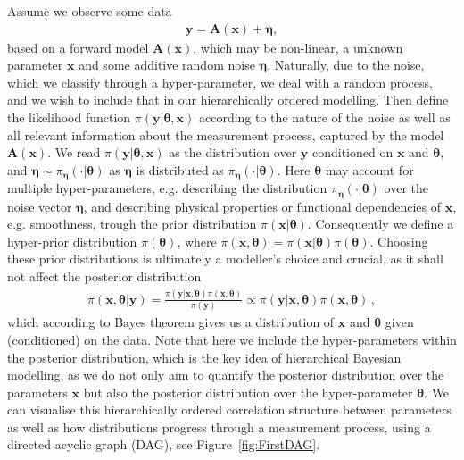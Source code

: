 Assume we observe some data
\begin{align}
	\bm{y} = \bm{A} (\bm{x}) + \bm{\eta},
	\label{eq:NonLinDat}
\end{align}
based on a forward model $\bm{A}(\bm{x})$, which may be non-linear, a unknown parameter $\bm{x}$ and some additive random noise $\bm{\eta}$.
Naturally, due to the noise, which we classify through a hyper-parameter, we deal with a random process, and we wish to include that in our hierarchically ordered modelling.
Then define the likelihood function $\pi(\bm{y}|\bm{\theta},\bm{x})$ according to the nature of the noise as well as all relevant information about the measurement process, captured by the model $\bm{A}(\bm{x})$.
We read $\pi(\bm{y}|\bm{\theta},\bm{x})$ as the distribution over $\bm{y}$ conditioned on $\bm{x}$ and $\bm{\theta}$, and $\bm{\eta} \sim \pi_{\bm{\eta}}(\cdot|\bm{\theta})$ as $\bm{\eta}$ is distributed as $\pi_{\bm{\eta}}(\cdot|\bm{\theta})$.
Here $\bm{\theta}$ may account for multiple hyper-parameters, e.g. describing the distribution $\pi_{\bm{\eta}}(\cdot|\bm{\theta})$ over the noise vector $\bm{\eta}$, and describing physical properties or functional dependencies of $\bm{x}$, e.g. smoothness, trough the prior distribution $\pi(\bm{x}|\bm{\theta})$.
Consequently we define a hyper-prior distribution $\pi(\bm{\theta})$, where $\pi(\bm{x}, \bm{\theta}) = \pi(\bm{x}|\bm{\theta}) \pi(\bm{\theta}) $.
Choosing these prior distributions is ultimately a modeller's choice and crucial, as it shall not affect the posterior distribution 
\begin{align}
	\pi(\bm{x},\bm{\theta}|\bm{y}) = \frac{ \pi(\bm{y} | \bm{x}, \bm{\theta} ) \pi(\bm{x}, \bm{\theta})}{\pi(\bm{y})} \propto \pi(\bm{y} | \bm{x}, \bm{\theta} ) \pi(\bm{x}, \bm{\theta}) \, ,
\end{align}
which according to Bayes theorem gives us a distribution of $\bm{x}$ and $\bm{\theta}$ given (conditioned) on the data.
Note that here we include the hyper-parameters within the posterior distribution, which is the key idea of hierarchical Bayesian modelling, as we do not only aim to quantify the posterior distribution over the parameters $\bm{x}$ but also the posterior distribution over the hyper-parameter $\bm{\theta}$.
We can visualise this hierarchically ordered correlation structure between parameters as well as how distributions progress through a measurement process, using a directed acyclic graph (DAG), see Figure~\ref{fig:FirstDAG}.


